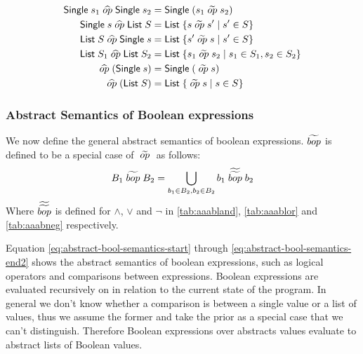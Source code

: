 \begin{align}\label{eq:generalBOP}
    \mathsf{Single} \; s_1 \aop \mathsf{Single} \; s_2 &= \mathsf{Single} \; (s_1 \aaop s_2) \\
    \mathsf{Single} \; s \aop \mathsf{List} \; S &= \mathsf{List} \; \{ s \aaop s' \mid s' \in S \}  \\
    \mathsf{List} \; S \aop \mathsf{Single} \; s &= \mathsf{List} \; \{ s' \aaop s \mid s' \in S \}  \\
    \mathsf{List} \; S_1 \aop \mathsf{List} \; S_2 &= \mathsf{List} \; \{ s_1 \aaop s_2 \mid s_1 \in S_1, s_2 \in S_2 \} \\
    \aop (\mathsf{Single} \; s) &= \mathsf{Single} \; (\aaop s) \\
    \aop (\mathsf{List} \; S) &= \mathsf{List} \; \{ \aaop s \mid s \in S \}
\end{align}

\subsubsection{Abstract Semantics of Boolean expressions}
We now define the general abstract semantics of boolean expressions.
$\widetilde{bop}$ is defined to be a special case of $\;\widetilde{op}\;$ as follows:
\begin{align}
    B_1 \;\widetilde{bop}\; B_2 = \bigcup_{b_1 \in B_2, b_2 \in B_2} b_1 \;\widetilde{\widetilde{bop}}\; b_2
\end{align}
Where $\widetilde{\widetilde{bop}}$ is defined for $\land$, $\lor$ and $\neg$ in \autoref{tab:aaabland}, \autoref{tab:aaablor} and \autoref{tab:aaabneg} respectively.

Equation \ref{eq:abstract-bool-semantics-start} through \ref{eq:abstract-bool-semantics-end2} shows the abstract semantics of boolean expressions, such as logical operators and comparisons between expressions.
Boolean expressions are evaluated recursively on in relation to the current state of the program.
In general we don't know whether a comparison is between a single value or a list of values, thus we assume the former and take the prior as a special case that we can't distinguish.
Therefore Boolean expressions over abstracts values evaluate to abstract lists of Boolean values.

